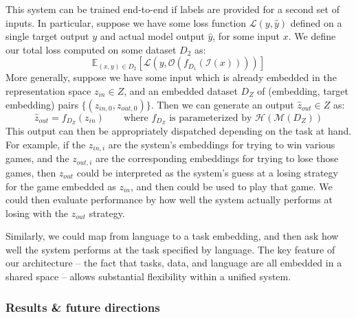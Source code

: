\documentclass[11pt]{article}
\begin{document}
This system can be trained end-to-end if labels are provided for a second set of inputs. In particular, suppose we have some loss function $\mathcal{L}(y, \hat{y})$ defined on a single target output $y$ and actual model output $\hat{y}$, for some input $x$. We define our total loss computed on some dataset $D_2$ as:
$$\mathbb{E}_{(x, y)\in {D}_2} \left[ \mathcal{L}\left(y, \mathcal{O}\left(f_{D_1}\left(\mathcal{I} \left(x\right)\right) \right)\right)\right]$$
More generally, suppose we have some input which is already embedded in the representation space $z_{in} \in Z$, and an embedded dataset $D_Z$ of (embedding, target embedding) pairs $\{(z_{in,0}, z_{out,0})\}$. Then we can generate an output $\hat{z}_{out} \in Z$ as:
$$\hat{z}_{out} = f_{D_Z}(z_{in}) \qquad \text{where } f_{D_Z} \text{ is parameterized by } \mathcal{H}\left(\mathcal{M}\left(D_Z\right)\right)$$
This output can then be appropriately dispatched depending on the task at hand. For example, if the $z_{in,i}$ are the system's embeddings for trying to win various games, and the $z_{out,i}$ are the corresponding embeddings for trying to lose those games, then $z_{out}$ could be interpreted as the system's guess at a losing strategy for the game embedded as $z_{in}$, and then could be used to play that game. We could then evaluate performance by how well the system actually performs at losing with the $z_{out}$ strategy. \par
Similarly, we could map from language to a task embedding, and then ask how well the system performs at the task specified by language. The key feature of our architecture -- the fact that tasks, data, and language are all embedded in a shared space -- allows substantial flexibility within a unified system.



\subsubsection{Results \& future directions}
\end{document}

